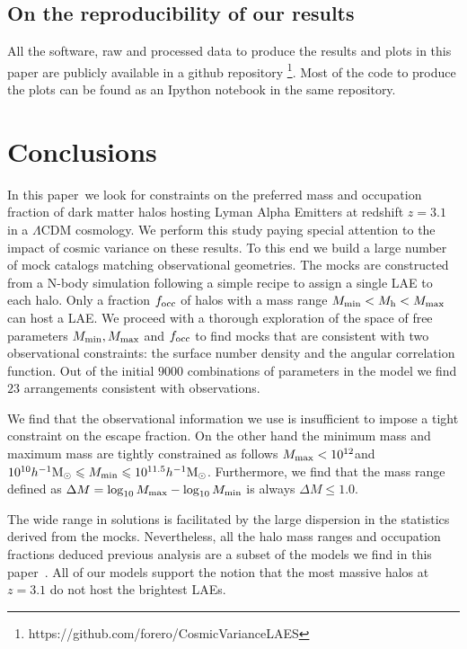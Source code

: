 \documentclass[usenatbib]{mn2e}
\newcommand{\documentname}{paper~}
\newcommand{\hMsun}{{\ifmmode{h^{-1}{\rm
        {M_{\odot}}}}\else{$h^{-1}{\rm{M_{\odot}}}$}\fi}}
\begin{document}
\subsection{On the reproducibility of our results}

All the software, raw and processed data to produce the results
and plots in this paper are publicly available in a github
repository \footnote{https://github.com/forero/CosmicVarianceLAES}. Most
of the code to produce the plots can be found as an Ipython notebook
\citep{IPython} in the same repository.



\section{Conclusions}
\label{sec:conclusions}

In this \documentname we look for constraints on the preferred mass
and occupation fraction of dark matter halos hosting Lyman Alpha Emitters at
redshift $z=3.1$ in a $\Lambda$CDM cosmology. We perform this study
paying special attention to the impact of cosmic variance on these
results. To this end we build a large number of mock catalogs matching
observational geometries. The mocks are constructed from a N-body simulation
following a simple recipe to assign a single LAE to each halo. Only
a fraction $f_{\rm occ}$ of halos with a mass range  $M_{\rm
  min}<M_{\rm h}<M_{\rm   max}$ can host a LAE. We proceed with a
thorough exploration of the space of free parameters $M_{\rm min},
M_{\rm max}$ and $f_{\rm occ}$ to find mocks that are consistent with
two observational constraints: the surface number density and the
angular correlation function. Out of the initial $9000$ 
combinations of parameters in the model we find $23$ arrangements
consistent with observations.

We find that the observational information we use is insufficient to
impose a tight constraint on the escape fraction. On the other hand
the minimum mass and maximum mass are tightly constrained as follows
$M_{\rm max}<10^{12}$\hMsun and $10^{10}\hMsun\leq M_{\rm min}\leq
10^{11.5}\hMsun$. Furthermore, we find that the mass range defined as
$\Delta M=\log_{10}M_{\rm max} - \log_{10}M_{\rm min}$ is always
$\Delta M\leq 1.0$.

The wide range in solutions is facilitated by the large dispersion in
the statistics derived from the mocks. Nevertheless, all the halo mass
ranges and occupation fractions deduced previous analysis
\citep[i.e.][]{Gawiser2007,Ouchi2010} are a subset of the models we
find in this \documentname. All of our models support the notion that
the most massive halos at $z=3.1$ do not host the brightest LAEs.
\end{document}
